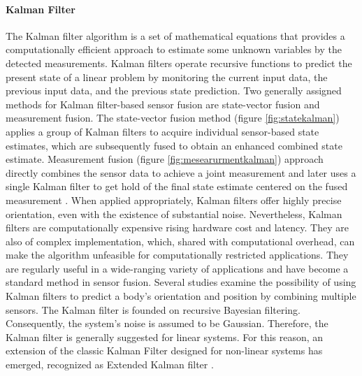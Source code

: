 \paragraph{Kalman Filter}

The Kalman filter algorithm is a set of mathematical equations that provides a computationally efficient approach to estimate some unknown variables by the detected measurements\cite{welch1995introduction}. Kalman filters operate recursive functions to predict the present state of a linear problem by monitoring the current input data, the previous input data, and the previous state prediction.  Two generally assigned methods for Kalman filter-based sensor fusion are state-vector fusion and measurement fusion. The state-vector fusion method (figure \ref{fig:statekalman}) applies a group of Kalman filters to acquire individual sensor-based state estimates, which are subsequently fused to obtain an enhanced combined state estimate. Measurement fusion (figure \ref{fig:mesearurmentkalman}) approach directly combines the sensor data to achieve a joint measurement and later uses a single Kalman filter to get hold of the final state estimate centered on the fused measurement \cite{mosallaei2007process}.
When applied appropriately, Kalman filters offer highly precise orientation, even with the existence of substantial noise. Nevertheless, Kalman filters are computationally expensive rising hardware cost and latency. They are also of complex implementation, which, shared with computational overhead, can make the algorithm unfeasible for computationally restricted applications. They are regularly useful in a wide-ranging variety of applications and have become a standard method in sensor fusion. Several studies examine the possibility of using Kalman filters to predict a body’s orientation and position by combining multiple sensors. The Kalman filter is founded on recursive Bayesian filtering.
Consequently, the system’s noise is assumed to be Gaussian. Therefore, the Kalman filter is generally suggested for linear systems. For this reason, an extension of the classic Kalman Filter designed for non-linear systems has emerged, recognized as Extended Kalman filter \cite{wilson2019formulation}.


